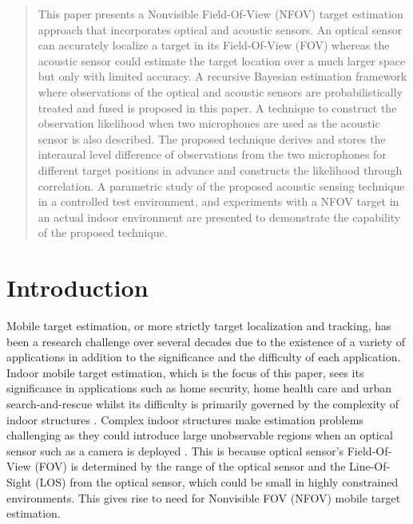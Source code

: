\maketitle

\begin{abstract}
This paper presents a Nonvisible Field-Of-View (NFOV) target estimation approach that incorporates optical and acoustic sensors.  An optical sensor can accurately localize a target in its Field-Of-View (FOV) whereas the acoustic sensor could estimate the target location over a much larger space but only with limited accuracy.  A recursive Bayesian estimation framework where observations of the optical and acoustic sensors are probabilistically treated and fused is proposed in this paper. A technique to construct the observation likelihood when two microphones are used as the acoustic sensor is also described.  The proposed technique derives and stores the interaural level difference of observations from the two microphones for different target positions in advance and constructs the likelihood through correlation.  A parametric study of the proposed acoustic sensing technique in a controlled test environment, and experiments with a NFOV target in an actual indoor environment are presented to demonstrate the capability of the proposed technique.  

\end{abstract}

\section{Introduction}
\label{intro} 
Mobile target estimation, or more strictly target localization and tracking, has been a research challenge over several decades due to the existence of a variety of applications in addition to the significance and the difficulty of each application.  Indoor mobile target estimation, which is the focus of this paper, sees its significance in applications such as home security, home health care and urban search-and-rescue whilst its difficulty is primarily governed by the complexity of indoor structures \cite{Bahl2000,Khoury2009}.  Complex indoor structures make estimation problems challenging as they could introduce large unobservable regions when an optical sensor such as a camera is deployed \cite{ledwich04}.  This is because optical sensor's Field-Of-View (FOV) is determined by the range of the optical sensor and the Line-Of-Sight (LOS) from the optical sensor, which could be small in highly constrained environments.  This gives rise to need for Nonvisible FOV (NFOV) mobile target estimation. 
 
